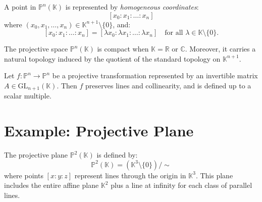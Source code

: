 \documentclass[11pt,openany]{article}
\begin{document}
\begin{definition}
	A point in \( \mathbb{P}^n(\mathbb{K}) \) is represented by \textit{homogeneous coordinates}:
	\[
	[x_0 : x_1 : \dots : x_n]
	\]
	where \( (x_0, x_1, \dots, x_n) \in \mathbb{K}^{n+1} \setminus \{0\} \), and:
	\[
	[x_0 : x_1 : \dots : x_n] = [\lambda x_0 : \lambda x_1 : \dots : \lambda x_n] \quad \text{for all } \lambda \in \mathbb{K} \setminus \{0\}.
	\]
\end{definition}

	The projective space \( \mathbb{P}^n(\mathbb{K}) \) is compact when \( \mathbb{K} = \mathbb{R} \) or \( \mathbb{C} \). Moreover, it carries a natural topology induced by the quotient of the standard topology on \( \mathbb{K}^{n+1} \).

\begin{theorem}
	Let \( f: \mathbb{P}^n \rightarrow \mathbb{P}^n \) be a projective transformation represented by an invertible matrix \( A \in \text{GL}_{n+1}(\mathbb{K}) \). Then \( f \) preserves lines and collinearity, and is defined up to a scalar multiple.
\end{theorem}

\section*{Example: Projective Plane}

\begin{example}
	The projective plane \( \mathbb{P}^2(\mathbb{K}) \) is defined by:
	\[
	\mathbb{P}^2(\mathbb{K}) = (\mathbb{K}^3 \setminus \{0\}) / \sim
	\]
	where points \([x:y:z]\) represent lines through the origin in \( \mathbb{K}^3 \). This plane includes the entire affine plane \( \mathbb{K}^2 \) plus a line at infinity for each class of parallel lines.
\end{example}
\fi
\end{document}
